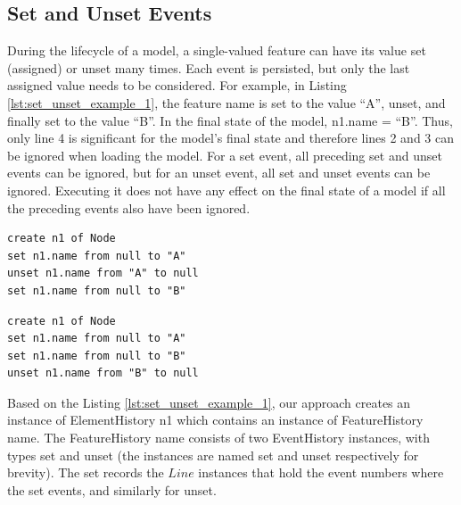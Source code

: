 \subsection{Set and Unset Events}
\label{subsec:set_and_unset_operations}
During the lifecycle of a model, a single-valued feature can have its value set (assigned) or unset many times. Each event is persisted, but only the last assigned value needs to be considered. For example, in Listing \ref{lst:set_unset_example_1}, the feature \textsf{name} is set to the value ``A'', unset, and finally set to the value ``B''.  In the final state of the model, \textsf{n1.name} = ``B''. Thus, only line 4 is significant for the model's final state and therefore lines 2 and 3 can be ignored when loading the model. For a \textsf{set} event, all preceding \textsf{set} and \textsf{unset} events can be ignored, but for an \textsf{unset} event, all \textsf{set} and \textsf{unset} events can be ignored. Executing it does not have any effect on the final state of a model if all the preceding events also have been ignored.

\vspace{-20pt}
\begin{minipage}[t]{0.49\linewidth}
\begin{lstlisting}[style=eol,caption={A CBP representation of attribute \textsf{name} assignments ended with SET.},label=lst:set_unset_example_1]
create n1 of Node
set n1.name from null to "A"
unset n1.name from "A" to null
set n1.name from null to "B"
\end{lstlisting}
\end{minipage}
\hfill
\begin{minipage}[t]{0.49\linewidth}
\begin{lstlisting}[style=eol,caption={A CBP representation of attribute \textsf{name} assignments ended with UNSET.},label=lst:set_unset_example_2]
create n1 of Node
set n1.name from null to "A"
set n1.name from null to "B"
unset n1.name from "B" to null
\end{lstlisting}
\end{minipage}

Based on the Listing \ref{lst:set_unset_example_1}, our approach creates an instance of \textsf{ElementHistory} \textsf{n1} which contains an instance of \textsf{FeatureHistory} \textsf{name}. The \textsf{FeatureHistory} \textsf{name} consists of two \textsf{EventHistory} instances, with types \textsf{set} and \textsf{unset} (the instances are named \textsf{set} and \textsf{unset} respectively for brevity). The \textsf{set} records the $Line$ instances that hold the event numbers where the \textsf{set} events, and similarly for \textsf{unset}.

